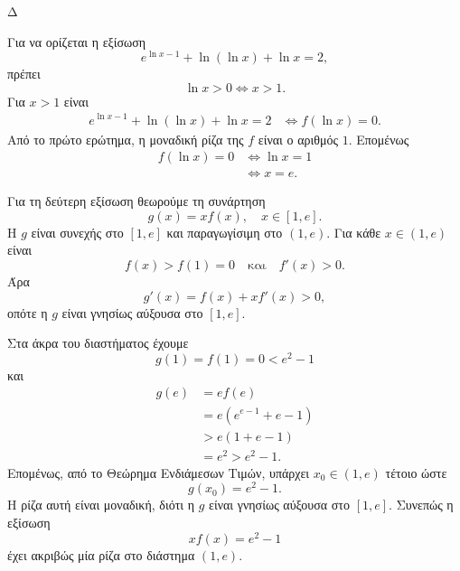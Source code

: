 \begin{thema}{Δ}
\begin{erwthma}
\item Για να ορίζεται η εξίσωση
\[
e^{\ln x-1}+\ln(\ln x)+\ln x=2,
\]
πρέπει
\[
\ln x>0
\Leftrightarrow
x>1.
\]
Για $x>1$ είναι
\begin{align*}
e^{\ln x-1}+\ln(\ln x)+\ln x=2
&\Leftrightarrow
f(\ln x)=0.
\end{align*}
Από το πρώτο ερώτημα, η μοναδική ρίζα της $f$ είναι ο αριθμός $1$. Επομένως
\begin{align*}
f(\ln x)=0
&\Leftrightarrow \ln x=1\\
&\Leftrightarrow {x=e}.
\end{align*}

Για τη δεύτερη εξίσωση θεωρούμε τη συνάρτηση
\[
g(x)=xf(x),\quad x\in[1,e].
\]
Η $g$ είναι συνεχής στο $[1,e]$ και παραγωγίσιμη στο $(1,e)$. Για κάθε $x\in(1,e)$ είναι
\[
f(x)>f(1)=0
\quad\text{και}\quad
f'(x)>0.
\]
Άρα
\[
g'(x)=f(x)+xf'(x)>0,
\]
οπότε η $g$ είναι γνησίως αύξουσα στο $[1,e]$.

Στα άκρα του διαστήματος έχουμε
\[
g(1)=f(1)=0<e^2-1
\]
και
\begin{align*}
g(e)
&=ef(e)\\
&=e\left(e^{e-1}+e-1\right)\\
&>e(1+e-1)\\
&=e^2>e^2-1.
\end{align*}
Επομένως, από το Θεώρημα Ενδιάμεσων Τιμών, υπάρχει $x_0\in(1,e)$ τέτοιο ώστε
\[
g(x_0)=e^2-1.
\]
Η ρίζα αυτή είναι μοναδική, διότι η $g$ είναι γνησίως αύξουσα στο $[1,e]$. Συνεπώς η εξίσωση
\[
xf(x)=e^2-1
\]
έχει ακριβώς μία ρίζα στο διάστημα $(1,e)$.
\end{erwthma}
\end{thema}

